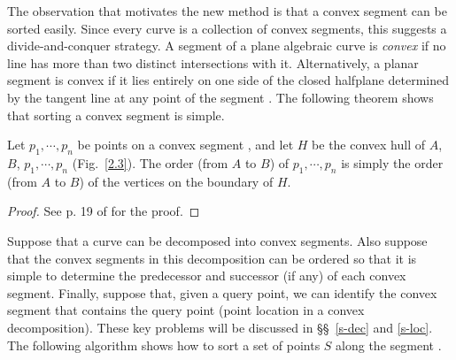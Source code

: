 The observation that motivates the new method is that 
a convex segment can be sorted easily.
Since every curve is a collection of convex segments,
this suggests a divide-and-conquer strategy.
A segment of a plane algebraic curve is {\em convex} if no line has 
more than 
two distinct intersections with it.
Alternatively, a planar segment is convex if it lies entirely on one side of
the closed halfplane determined by the tangent line at any point of
the segment \cite{Do}.
The following theorem shows that sorting a convex segment is simple.

\begin{theorem}
\label{T-s}
Let $p_{1},\cdots,p_{n}$ be points on a convex segment , 
and let $H$ 
be the convex hull of $A$, $B$, 
$p_{1},\cdots,p_{n}$ {\rm (}Fig.~{\rm \ref{2.3})}.
The order {\rm (}from $A$ to $B${\rm )} of $p_{1},\cdots,p_{n}$ is simply 
the order {\rm (}from $A$ to $B${\rm )} of the vertices on the boundary 
of $H$.
\end{theorem}

\begin{proof}
See p. 19 of \cite{jj} for the proof.
\end{proof}

\vspace{.2in}


Suppose that a curve can be decomposed into convex segments.
Also suppose that the convex segments in this decomposition can be ordered
so that it is simple to determine the predecessor and successor (if any) 
of each
convex segment.
Finally, suppose that, given a query point, 
we can identify the convex segment 
that contains the query point (point location in a convex decomposition).
These key problems will be discussed in 
\S\S~\ref{s-dec} and \ref{s-loc}.
The following algorithm shows how to sort a set of points $S$ 
along the segment .

\vspace{.2in}

